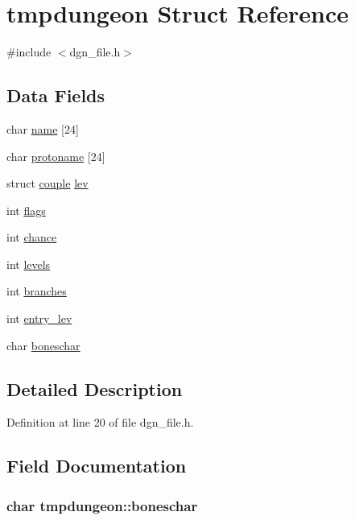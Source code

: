 \hypertarget{structtmpdungeon}{\section{tmpdungeon Struct Reference}
\label{structtmpdungeon}
}


{\ttfamily \#include $<$dgn\+\_\+file.\+h$>$}

\subsection*{Data Fields}
\begin{DoxyCompactItemize}
\item 
char \hyperlink{structtmpdungeon_aa57aa9313d02961f4d58a8e5cb08a64b}{name} \mbox{[}24\mbox{]}
\item 
char \hyperlink{structtmpdungeon_a6c02e2269f8d30a02dfe6987aedc85d2}{protoname} \mbox{[}24\mbox{]}
\item 
struct \hyperlink{structcouple}{couple} \hyperlink{structtmpdungeon_a8e9878596c73df9c21d64819eab65dad}{lev}
\item 
int \hyperlink{structtmpdungeon_a74d4c51688298b07b0f2daa838f219e3}{flags}
\item 
int \hyperlink{structtmpdungeon_a694d5229dbc54691792983a89c54717e}{chance}
\item 
int \hyperlink{structtmpdungeon_adda9123efc4eaa10d821ff2da2b777dc}{levels}
\item 
int \hyperlink{structtmpdungeon_a98b40263b4773d613ce8e98598f5924b}{branches}
\item 
int \hyperlink{structtmpdungeon_aea3606dba7db6efd221b5f87558368f9}{entry\+\_\+lev}
\item 
char \hyperlink{structtmpdungeon_a1cbe250e384f693cd17e30206eb7e664}{boneschar}
\end{DoxyCompactItemize}


\subsection{Detailed Description}


Definition at line 20 of file dgn\+\_\+file.\+h.



\subsection{Field Documentation}
\hypertarget{structtmpdungeon_a1cbe250e384f693cd17e30206eb7e664}{
\subsubsection[{boneschar}]{\setlength{\rightskip}{0pt plus 5cm}char tmpdungeon\+::boneschar}}\label{structtmpdungeon_a1cbe250e384f693cd17e30206eb7e664}


